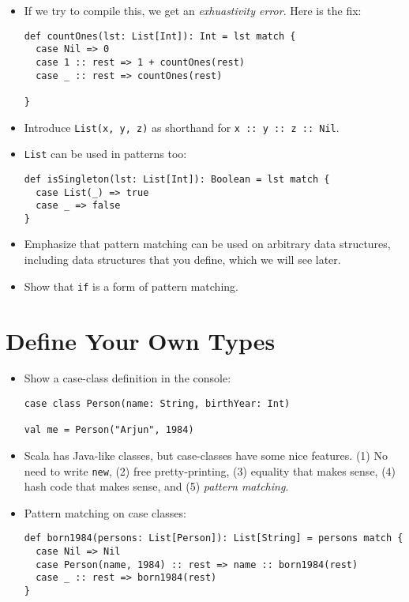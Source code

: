 \documentclass{book}
\begin{document}
\begin{itemize}
\item If we try to compile this, we get an \emph{exhuastivity error}. Here
is the fix:
%
\begin{verbatim}
def countOnes(lst: List[Int]): Int = lst match {
  case Nil => 0
  case 1 :: rest => 1 + countOnes(rest)
  case _ :: rest => countOnes(rest)

}
\end{verbatim}

\item Introduce \verb|List(x, y, z)| as shorthand for \verb|x :: y :: z :: Nil|.

\item \verb|List| can be used in patterns too:
%
\begin{verbatim}
def isSingleton(lst: List[Int]): Boolean = lst match {
  case List(_) => true
  case _ => false
}
\end{verbatim}

\item Emphasize that pattern matching can be used on arbitrary data structures,
including data structures that you define, which we will see later.

\item Show that \verb|if| is a form of pattern matching.

\end{itemize}

\section{Define Your Own Types}

\begin{itemize}

\item Show a case-class definition in the console:
%
\begin{verbatim}
case class Person(name: String, birthYear: Int)

val me = Person("Arjun", 1984)
\end{verbatim}

\item Scala has Java-like classes, but case-classes have some nice features.
(1) No need to write \verb|new|, (2) free pretty-printing, (3) equality
that makes sense, (4) hash code that makes sense, and (5) \emph{pattern matching}.

\item Pattern matching on case classes:
%
\begin{verbatim}
def born1984(persons: List[Person]): List[String] = persons match {
  case Nil => Nil
  case Person(name, 1984) :: rest => name :: born1984(rest)
  case _ :: rest => born1984(rest)
}
\end{verbatim}

\end{itemize}
\end{document}
